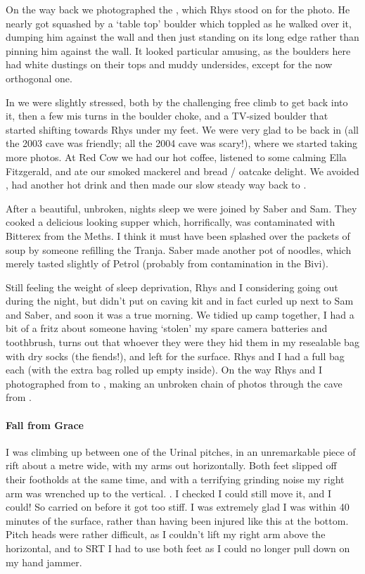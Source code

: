 On the way back we photographed the , which Rhys stood on for the photo. He nearly got squashed by a `table top' boulder which toppled as he walked over it, dumping him against the wall and then just standing on its long edge rather than pinning him against the wall. It looked particular amusing, as the boulders here had white dustings on their tops and muddy undersides, except for the now orthogonal one.


In  we were slightly stressed, both by the challenging free climb to get back into it, then a few mis turns in the boulder choke, and a TV-sized boulder that started shifting towards Rhys under my feet. We were very glad to be back in  (all the 2003 cave was friendly; all the 2004 cave was scary!), where we started taking more photos.
At Red Cow we had our hot coffee, listened to some calming Ella Fitzgerald, and ate our smoked mackerel and bread / oatcake delight. We avoided , had another hot drink and then made our slow steady way back to .

After a beautiful, unbroken, nights sleep we were joined by Saber and Sam. They cooked a delicious looking supper which, horrifically, was contaminated with Bitterex from the Meths. I think it must have been splashed over the packets of soup by someone refilling the Tranja. Saber made another pot of noodles, which merely tasted slightly of Petrol (probably from contamination in the Bivi).




Still feeling the weight of sleep deprivation, Rhys and I considering going out during the night, but didn't put on caving kit and in fact curled up next to Sam and Saber, and soon it was a true morning. We tidied up camp together, I had a bit of a fritz about someone having `stolen' my spare camera batteries and toothbrush, turns out that whoever they were they hid them in my resealable bag with dry socks (the fiends!), and left for the surface. Rhys and I had a full bag each (with the extra bag rolled up empty inside). On the way Rhys and I photographed from  to , making an unbroken chain of photos through the cave from .


\paragraph{Fall from Grace}
I was climbing up between one of the Urinal pitches, in an unremarkable piece of rift about a metre wide, with my arms out horizontally. Both feet slipped off their footholds at the same time, and with a terrifying grinding noise my right arm was wrenched up to the vertical. . I checked I could still move it, and I could! So carried on before it got too stiff. I was extremely glad I was within 40 minutes of the surface, rather than having been injured like this at the bottom. Pitch heads were rather difficult, as I couldn't lift my right arm above the horizontal, and to SRT I had to use both feet as I could no longer pull down on my hand jammer.

